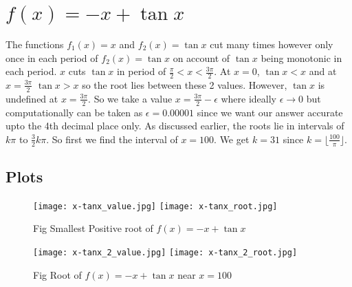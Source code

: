 \documentclass{article}
\begin{document}
\newpage
\section{$f(x) = -x +\tan{x}$}
The functions $f_1(x) = x$ and $f_2(x) = \tan{x}$ cut many times however only once in each period of $f_2(x) = \tan{x}$ on account of $\tan{x}$ being monotonic in each period. $x$ cuts $\tan{x}$ in period of $\frac{\pi}{2} < x < \frac{3\pi}{2}$. At $x = 0$, $\tan{x} < x$ and at $x = \frac{3\pi}{2}$ $\tan{x} > x$ so the root lies between these 2 values. 
\newline
However, $\tan{x}$ is undefined at $x = \frac{3\pi}{2}$. So we take a value $x = \frac{3\pi}{2} - \epsilon$ where ideally $\epsilon \to 0$ but computationally can be taken as $\epsilon = 0.00001$ since we want our answer accurate upto the 4th decimal place only.
\newline
As discussed earlier, the roots lie in intervals of $k\pi$ to $\frac{3}{2}k\pi$. So first we find the interval of $x = 100$. We get $k = 31$ since $k = \lfloor \frac{100}{\pi} \rfloor$. 
\subsection{Plots}
\begin{figure}[!h]
    \centering
    \texttt{[image: x-tanx\_value.jpg]}
    \texttt{[image: x-tanx\_root.jpg]}
    \caption{Fig Smallest Positive root of $f(x) = -x +\tan{x}$ }
    \label{fig:ques11_a}
\end{figure}
\begin{figure}[!h]
    \centering
    \texttt{[image: x-tanx\_2\_value.jpg]}
    \texttt{[image: x-tanx\_2\_root.jpg]}
    \caption{Fig Root of $f(x) = -x +\tan{x}$ near $x = 100$}
    \label{fig:ques11_b}
\end{figure}
\
\end{document}
